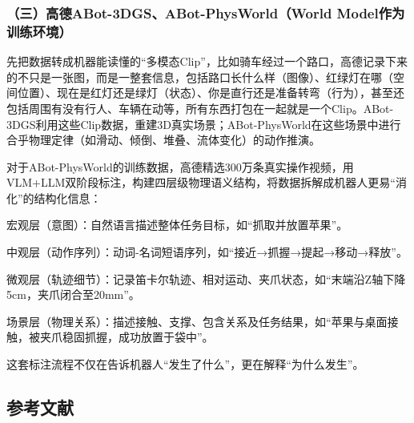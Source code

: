 \hypertarget{ux4e09ux9ad8ux5fb7abot-3dgsabot-physworldworld-modelux4f5cux4e3aux8badux7ec3ux73afux5883}{%
\subsubsection{（三）高德ABot-3DGS、ABot-PhysWorld（World Model作为训练环境）}\label{ux4e09ux9ad8ux5fb7abot-3dgsabot-physworldworld-modelux4f5cux4e3aux8badux7ec3ux73afux5883}}

先把数据转成机器能读懂的``多模态Clip''，比如骑车经过一个路口，高德记录下来的不只是一张图，而是一整套信息，包括路口长什么样（图像）、红绿灯在哪（空间位置）、现在是红灯还是绿灯（状态）、你是直行还是准备转弯（行为），甚至还包括周围有没有行人、车辆在动等，所有东西打包在一起就是一个Clip。ABot-3DGS利用这些Clip数据，重建3D真实场景；ABot-PhysWorld在这些场景中进行合乎物理定律（如滑动、倾倒、堆叠、流体变化）的动作推演。

对于ABot-PhysWorld的训练数据，高德精选300万条真实操作视频，用VLM+LLM双阶段标注，构建四层级物理语义结构，将数据拆解成机器人更易``消化''的结构化信息：

宏观层（意图）：自然语言描述整体任务目标，如``抓取并放置苹果''。

中观层（动作序列）：动词-名词短语序列，如``接近→抓握→提起→移动→释放''。

微观层（轨迹细节）：记录笛卡尔轨迹、相对运动、夹爪状态，如``末端沿Z轴下降5cm，夹爪闭合至20mm''。

场景层（物理关系）：描述接触、支撑、包含关系及任务结果，如``苹果与桌面接触，被夹爪稳固抓握，成功放置于袋中''。

这套标注流程不仅在告诉机器人``发生了什么''，更在解释``为什么发生''。

\hypertarget{ux53c2ux8003ux6587ux732e-172}{%
\subsection{参考文献}\label{ux53c2ux8003ux6587ux732e-172}}

